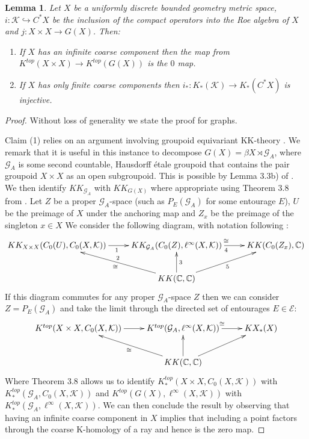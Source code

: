 \documentclass[preprint]{elsarticle}
\theoremstyle{plain}
\newtheorem{lemma}[theorem]{Lemma}%
\theoremstyle{definition}%
\theoremstyle{remark}%
\newcommand{\G}{\mathcal{G}}
\begin{document}
\begin{lemma}\label{lem:zandi}
Let $X$ be a uniformly discrete bounded geometry metric space, $i: \mathcal{K} \hookrightarrow C^{*}X$ be the inclusion of the compact operators into the Roe algebra of $X$ and $j:X\times X \rightarrow G(X)$. Then:
\begin{enumerate}
\item If $X$ has an infinite coarse component then the map from $K^{top}(X \times X) \rightarrow K^{top}(G(X))$ is the $0$ map.
\item If $X$ has only finite coarse components then $i_{*}:K_{*}(\mathcal{K}) \rightarrow K_{*}(C^{*}X)$ is injective.
\end{enumerate}
\end{lemma}
\begin{proof}
Without loss of generality we state the proof for graphs. 

Claim (1) relies on an argument involving groupoid equivariant KK-theory \cite{MR1656031,MR1686846,MR1798599}. We remark that it is useful in this instance to decompose $G(X)=\beta X \rtimes \G_{A}$, where $\G_{A}$ is some second countable, Hausdorff \'etale groupoid that contains the pair groupoid $X \times X$ as an open subgroupoid. This is possible by Lemma 3.3b) of \cite{MR1905840}. We then identify $KK_{\G_{A}}$ with $KK_{G(X)}$ where appropriate using Theorem 3.8 from \cite{cbcag2}. Let $Z$ be a proper $\G_{A}$-space (such as $P_{E}(\G_{A})$ for some entourage $E$), $U$ be the preimage of $X$ under the anchoring map and $Z_{x}$ be the preimage of the singleton $x \in X$ We consider the following diagram, with notation following \cite{MR1905840,MR1656031}:
\begin{equation*}
\xymatrix{KK_{X\times X}(C_{0}(U),C_{0}(X,\mathcal{K})) \ar[r]_{1} & KK_{\G_{A}}(C_{0}(Z),\ell^{\infty}(X,\mathcal{K})) \ar[r]^{\cong}_{4}  & KK(C_{0}(Z_{x}),\mathbb{C}) \\
& KK(\mathbb{C},\mathbb{C}) \ar^{\cong}_{2}[lu]\ar[u]_{3}\ar[ur]_{5}&
}
\end{equation*}
If this diagram commutes for any proper $\G_{A}$-space $Z$ then we can consider $Z = P_{E}(\G_{A})$ and take the limit through the directed set of entourages $E \in \mathcal{E}$:
\begin{equation*}
\xymatrix{K^{top}(X \times X, C_{0}(X,\mathcal{K})) \ar[r] & K^{top}(\G_{A},\ell^{\infty}(X,\mathcal{K})) \ar[r]^{\cong}  & KX_{*}(X) \\
& KK(\mathbb{C},\mathbb{C}) \ar^{\cong}[lu]\ar[u]\ar[ur]&
}
\end{equation*}
Where Theorem 3.8 \cite{cbcag2} allows us to identify $K^{top}_{*}(X\times X , C_{0}(X,\mathcal{K}))$ with $K^{top}_{*}(\G_{A}, C_{0}(X,\mathcal{K}))$ and $K^{top}(G(X), \ell^{\infty}(X,\mathcal{K}))$ with $K^{top}_{*}(\G_{A},\ell^{\infty}(X,\mathcal{K}))$. We can then conclude the result by observing that having an infinite coarse component in $X$ implies that including a point factors through the coarse K-homology of a ray and hence is the zero map.


\end{proof}
\end{document}

